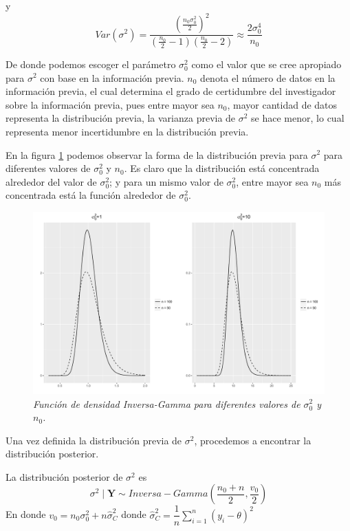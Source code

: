 \documentclass[10pt,openright]{book}\usepackage[]{graphicx}\usepackage[]{color}
\begin{document}
    y
    \begin{equation*}
    Var(\sigma^2)=\dfrac{\left(\frac{n_0\sigma^2_0}{2}\right)^2}{\left(\frac{n_0}{2}-1\right)\left(\frac{n_0}{2}-2\right)}\approx \dfrac{2\sigma^4_0}{n_0}
    \end{equation*}
    
    De donde podemos escoger el par\'ametro $\sigma^2_0$ como  el valor que se cree apropiado para $\sigma^2$ con base en la informaci\'on previa. $n_0$ denota el n\'umero de datos en la informaci\'on previa, el cual determina el grado de certidumbre del investigador sobre la informaci\'on previa, pues entre mayor sea $n_0$, mayor cantidad de datos representa la distribuci\'on previa, la varianza previa de $\sigma^2$ se hace menor, lo cual representa menor incertidumbre en la distribuci\'on previa.
    
    En la figura \ref{Priori_Sigma2} podemos observar la forma de la distribuci\'on previa para $\sigma^2$ para diferentes valores de $\sigma^2_0$ y $n_0$. Es claro que la distribuci\'on est\'a concentrada alrededor del valor de $\sigma^2_0$; y para un mismo valor de $\sigma^2_0$, entre mayor sea $n_0$ m\'as concentrada est\'a la funci\'on alrededor de $\sigma^2_0$.
    \begin{figure}[!h]
    \centering
    \includegraphics[scale=0.5]{Priori_Sigma2.pdf}
    \caption{\emph{Funci\'on de densidad Inversa-Gamma para diferentes valores de $\sigma^2_0$ y $n_0$.}}
    \label{Priori_Sigma2}
    \end{figure}
    
    Una vez definida la distribuci\'on previa de $\sigma^2$, procedemos a encontrar la distribuci\'on posterior.
    \begin{Res}\label{posterior_sigma2}
    La distribuci\'on posterior de $\sigma^2$ es
    \begin{equation*}
    \sigma^2  \mid \mathbf{Y} \sim Inversa-Gamma\left(\frac{n_0+n}{2},\frac{v_0}{2}\right)
    \end{equation*}
    En donde $v_0=n_0\sigma^2_0+n\hat{\sigma}^2_C$ donde $\hat{\sigma}^2_C=\dfrac{1}{n}\sum_{i=1}^n(y_i-\theta)^2$
    \end{Res}
    
\end{document}
